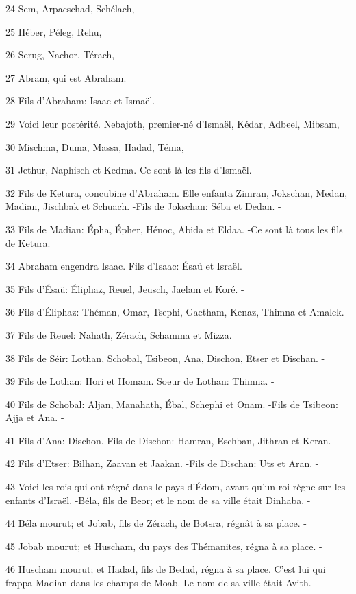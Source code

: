 \par 24 Sem, Arpacschad, Schélach,
\par 25 Héber, Péleg, Rehu,
\par 26 Serug, Nachor, Térach,
\par 27 Abram, qui est Abraham.
\par 28 Fils d'Abraham: Isaac et Ismaël.
\par 29 Voici leur postérité. Nebajoth, premier-né d'Ismaël, Kédar, Adbeel, Mibsam,
\par 30 Mischma, Duma, Massa, Hadad, Téma,
\par 31 Jethur, Naphisch et Kedma. Ce sont là les fils d'Ismaël.
\par 32 Fils de Ketura, concubine d'Abraham. Elle enfanta Zimran, Jokschan, Medan, Madian, Jischbak et Schuach. -Fils de Jokschan: Séba et Dedan. -
\par 33 Fils de Madian: Épha, Épher, Hénoc, Abida et Eldaa. -Ce sont là tous les fils de Ketura.
\par 34 Abraham engendra Isaac. Fils d'Isaac: Ésaü et Israël.
\par 35 Fils d'Ésaü: Éliphaz, Reuel, Jeusch, Jaelam et Koré. -
\par 36 Fils d'Éliphaz: Théman, Omar, Tsephi, Gaetham, Kenaz, Thimna et Amalek. -
\par 37 Fils de Reuel: Nahath, Zérach, Schamma et Mizza.
\par 38 Fils de Séir: Lothan, Schobal, Tsibeon, Ana, Dischon, Etser et Dischan. -
\par 39 Fils de Lothan: Hori et Homam. Soeur de Lothan: Thimna. -
\par 40 Fils de Schobal: Aljan, Manahath, Ébal, Schephi et Onam. -Fils de Tsibeon: Ajja et Ana. -
\par 41 Fils d'Ana: Dischon. Fils de Dischon: Hamran, Eschban, Jithran et Keran. -
\par 42 Fils d'Etser: Bilhan, Zaavan et Jaakan. -Fils de Dischan: Uts et Aran. -
\par 43 Voici les rois qui ont régné dans le pays d'Édom, avant qu'un roi règne sur les enfants d'Israël. -Béla, fils de Beor; et le nom de sa ville était Dinhaba. -
\par 44 Béla mourut; et Jobab, fils de Zérach, de Botsra, régnât à sa place. -
\par 45 Jobab mourut; et Huscham, du pays des Thémanites, régna à sa place. -
\par 46 Huscham mourut; et Hadad, fils de Bedad, régna à sa place. C'est lui qui frappa Madian dans les champs de Moab. Le nom de sa ville était Avith. -
